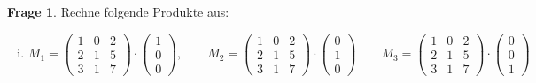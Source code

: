 \documentclass{scrartcl}
\theoremstyle{definition}
\newtheorem{frage}{Frage}
\begin{document}
\begin{frage}
Rechne folgende Produkte aus:
\begin{enumerate}[(i)]
\item \[
M_1 = 
\begin{pmatrix}
  1  & 0 & 2 \\
  2  & 1 & 5 \\
  3  & 1 & 7
\end{pmatrix} \cdot \begin{pmatrix}
  1 \\ 0 \\ 0
\end{pmatrix}, \qquad M_2 =
\begin{pmatrix}
  1  & 0 & 2 \\
  2  & 1 & 5 \\
  3  & 1 & 7
\end{pmatrix} \cdot \begin{pmatrix}
  0 \\ 1 \\ 0
\end{pmatrix} \qquad M_3 =
\begin{pmatrix}
  1  & 0 & 2 \\
  2  & 1 & 5 \\
  3  & 1 & 7
\end{pmatrix} \cdot \begin{pmatrix}
  0 \\ 0 \\ 1
\end{pmatrix}
\]


\end{enumerate}
\end{frage}
\end{document}
